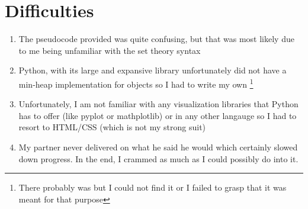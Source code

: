 \documentclass{article}
\begin{document}
\section{Difficulties}
\begin{enumerate}
    \item The pseudocode provided was quite confusing, but that was most likely due to me
        being unfamiliar with the set theory syntax
    \item Python, with its large and expansive library unfortunately did not have a min-heap
        implementation for objects so I had to write my own \footnote{There probably was but
        I could not find it or I failed to grasp that it was meant for that purpose}
    \item Unfortunately, I am not familiar with any visualization libraries that Python has to
        offer (like pyplot or mathplotlib) or in any other langauge so I had to resort to
        HTML/CSS (which is not my strong suit)
    \item My partner never delivered on what he said he would which certainly slowed down
        progress. In the end, I crammed as much as I could possibly do into it.
\end{enumerate}
\end{document}
